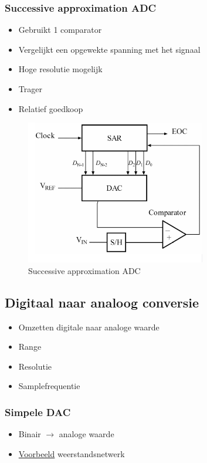 \documentclass{article}
\begin{document}
\subsubsection{Successive approximation ADC}
\begin{itemize}
    \item Gebruikt 1 comparator
    \item Vergelijkt een opgewekte spanning met het signaal
    \item Hoge resolutie mogelijk
    \item Trager
    \item Relatief goedkoop
\end{itemize}

\begin{figure}[H]
    \centering
    \includegraphics[width=0.7\textwidth]{Screenshot_20200224_122846.png}
    \caption{Successive approximation ADC}
\end{figure}

\subsection{Digitaal naar analoog conversie}
\begin{itemize}
    \item Omzetten digitale naar analoge waarde
    \item Range
    \item Resolutie
    \item Samplefrequentie
\end{itemize}

\subsubsection{Simpele DAC}
\begin{itemize}
    \item Binair $\rightarrow$ analoge waarde
    \item \underline{Voorbeeld} weerstandsnetwerk
\end{itemize}
\end{document}
